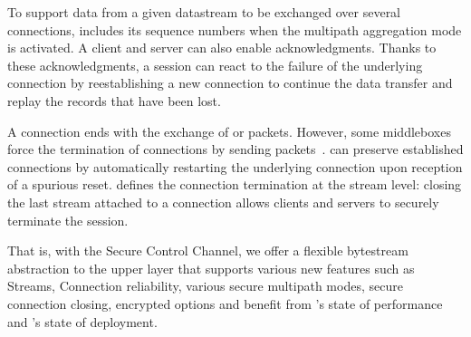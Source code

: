 
To support data from a given datastream to be exchanged over several \tcp
connections, \tcpls includes its sequence numbers when the multipath aggregation
mode is activated. A client and server can also enable acknowledgments. Thanks
to these \tcpls acknowledgments, a \tcpls session can react to the failure of
the underlying \tcp connection by reestablishing a new \tcp connection to
continue the data transfer and replay the records that have been lost.

A \tcp connection ends with the exchange of \fin or \rst packets. However, some
middleboxes force the termination of \tcp connections by sending \rst
packets~\cite{rfc3360,weaver2009detecting}. \tcpls can preserve established
connections by automatically restarting the underlying \tcp connection upon
reception of a spurious reset. \tcpls defines the connection termination at the
stream level: closing the last stream attached to a \tcp connection allows
clients and servers to securely terminate the \tcpls session.

That is, with the Secure Control Channel, we offer a flexible bytestream
abstraction to the upper layer that supports various new features such as
Streams, Connection reliability, various secure multipath modes, secure
connection closing,  encrypted \tcp options and benefit from \tcp's state of performance and \tls's state of deployment.


